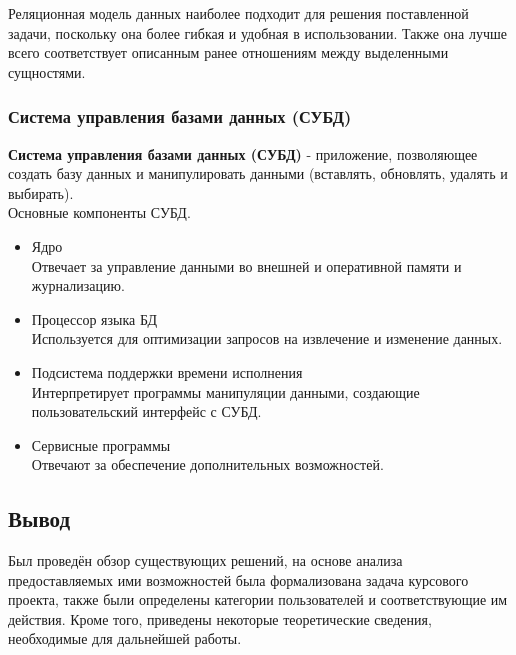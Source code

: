 	Реляционная модель данных наиболее подходит для решения поставленной задачи, поскольку она более гибкая и удобная в использовании. Также она лучше всего соответствует описанным ранее отношениям между выделенными сущностями.
	
	\subsubsection{Система управления базами данных (СУБД)}
	\textbf{Система управления базами данных (СУБД)} - приложение, позволяющее создать базу данных и манипулировать данными (вставлять, обновлять, удалять и выбирать).\\
	Основные компоненты СУБД. \cite{db_systems}
	\begin{itemize}
		\item Ядро \\
		Отвечает за управление данными во внешней и оперативной памяти и журнализацию.
		\item Процессор языка БД\\
		Используется для оптимизации запросов на извлечение и изменение данных.
		\item Подсистема поддержки времени исполнения\\
		Интерпретирует программы манипуляции данными, создающие пользовательский интерфейс с СУБД.
		\item Сервисные программы\\
		Отвечают за обеспечение дополнительных возможностей.
	\end{itemize}

	\subsection*{Вывод}
	Был проведён обзор существующих решений, на основе анализа предоставляемых ими возможностей была формализована задача курсового проекта, также были определены категории пользователей и соответствующие им действия. Кроме того, приведены некоторые теоретические сведения, необходимые для дальнейшей работы.
	
	